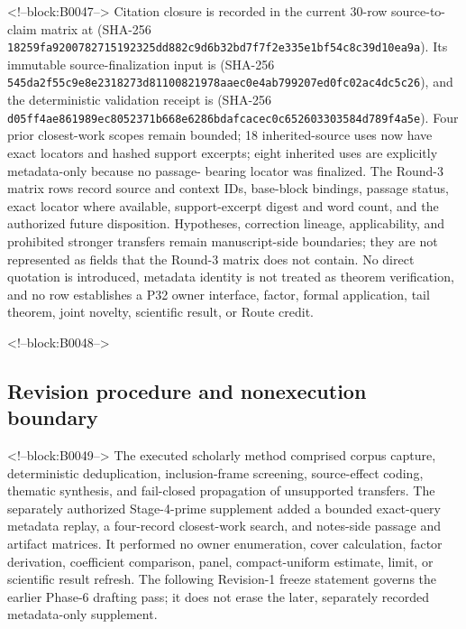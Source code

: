 \documentclass[11pt]{article}
\begin{document}
<!--block:B0047-->
\begingroup\sloppy
Citation closure is recorded in the current 30-row source-to-claim matrix at
 (SHA-256
\texttt{18259fa9\allowbreak{}20078271\allowbreak{}5192325d\allowbreak{}d882c9d6\allowbreak{}b32bd7f7\allowbreak{}f2e335e1\allowbreak{}bf54c8c3\allowbreak{}9d10ea9a}). Its immutable source-finalization input is
 (SHA-256
\texttt{545da2f5\allowbreak{}5c9e8e23\allowbreak{}18273d81\allowbreak{}10082197\allowbreak{}8aaec0e4\allowbreak{}ab799207\allowbreak{}ed0fc02a\allowbreak{}c4dc5c26}), and the deterministic validation receipt is
 (SHA-256
\texttt{d05ff4ae\allowbreak{}861989ec\allowbreak{}8052371b\allowbreak{}668e6286\allowbreak{}bdafcace\allowbreak{}c0c65260\allowbreak{}3303584d\allowbreak{}789f4a5e}). Four prior closest-work scopes remain
bounded; 18 inherited-source uses now have exact locators and hashed support
excerpts; eight inherited uses are explicitly metadata-only because no passage-
bearing locator was finalized. The Round-3 matrix rows record source and context IDs,
base-block bindings, passage status, exact locator where available, support-excerpt
digest and word count, and the authorized future disposition. Hypotheses, correction
lineage, applicability, and prohibited stronger transfers remain manuscript-side
boundaries; they are not represented as fields that the Round-3 matrix does not
contain. No direct quotation is introduced, metadata identity is not treated as
theorem verification, and no row establishes a P32 owner interface, factor, formal
application, tail theorem, joint novelty, scientific result, or Route credit.
\par\endgroup

<!--block:B0048-->
\hypertarget{32-revision-procedure-and-nonexecution-boundary}{%
\subsection{Revision procedure and nonexecution
boundary}\label{32-revision-procedure-and-nonexecution-boundary}}

<!--block:B0049-->
The executed scholarly method comprised corpus capture, deterministic
deduplication, inclusion-frame screening, source-effect coding, thematic
synthesis, and fail-closed propagation of unsupported transfers.  The separately
authorized Stage-4-prime supplement added a bounded exact-query metadata replay,
a four-record closest-work search, and notes-side passage and artifact matrices.
It performed no owner enumeration, cover calculation, factor derivation,
coefficient comparison, panel, compact-uniform estimate, limit, or scientific
result refresh.  The following Revision-1 freeze statement governs the earlier
Phase-6 drafting pass; it does not erase the later, separately recorded
metadata-only supplement.
\end{document}
